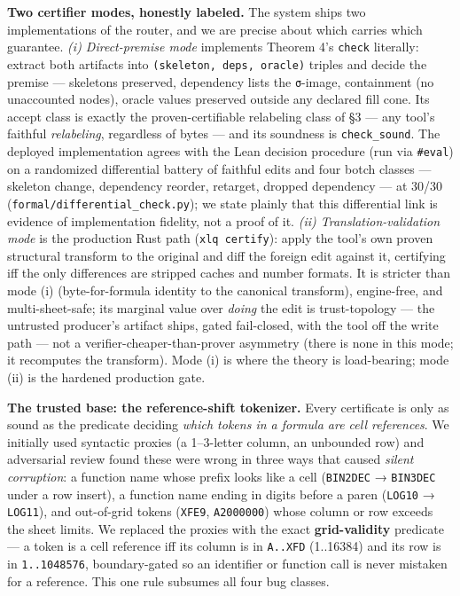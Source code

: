\documentclass[
  11pt,
]{article}
\begin{document}
\textbf{Two certifier modes, honestly labeled.} The system ships two
implementations of the router, and we are precise about which carries
which guarantee. \emph{(i) Direct-premise mode} implements Theorem 4's
\texttt{check} literally: extract both artifacts into
\texttt{(skeleton,\ deps,\ oracle)} triples and decide the premise ---
skeletons preserved, dependency lists the \texttt{σ}-image, containment
(no unaccounted nodes), oracle values preserved outside any declared
fill cone. Its accept class is exactly the proven-certifiable relabeling
class of §3 --- any tool's faithful \emph{relabeling}, regardless of
bytes --- and its soundness is \texttt{check\_sound}. The deployed
implementation agrees with the Lean decision procedure (run via
\texttt{\#eval}) on a randomized differential battery of faithful edits
and four botch classes --- skeleton change, dependency reorder,
retarget, dropped dependency --- at 30/30
(\texttt{formal/differential\_check.py}); we state plainly that this
differential link is evidence of implementation fidelity, not a proof of
it. \emph{(ii) Translation-validation mode} is the production Rust path
(\texttt{xlq\ certify}): apply the tool's own proven structural
transform to the original and diff the foreign edit against it,
certifying iff the only differences are stripped caches and number
formats. It is stricter than mode (i) (byte-for-formula identity to the
canonical transform), engine-free, and multi-sheet-safe; its marginal
value over \emph{doing} the edit is trust-topology --- the untrusted
producer's artifact ships, gated fail-closed, with the tool off the
write path --- not a verifier-cheaper-than-prover asymmetry (there is
none in this mode; it recomputes the transform). Mode (i) is where the
theory is load-bearing; mode (ii) is the hardened production gate.

\textbf{The trusted base: the reference-shift tokenizer.} Every
certificate is only as sound as the predicate deciding \emph{which
tokens in a formula are cell references}. We initially used syntactic
proxies (a 1--3-letter column, an unbounded row) and adversarial review
found these were wrong in three ways that caused \emph{silent
corruption}: a function name whose prefix looks like a cell
(\texttt{BIN2DEC} → \texttt{BIN3DEC} under a row insert), a function
name ending in digits before a paren (\texttt{LOG10} → \texttt{LOG11}),
and out-of-grid tokens (\texttt{XFE9}, \texttt{A2000000}) whose column
or row exceeds the sheet limits. We replaced the proxies with the exact
\textbf{grid-validity} predicate --- a token is a cell reference iff its
column is in \texttt{A..XFD} (1..16384) and its row is in
\texttt{1..1048576}, boundary-gated so an identifier or function call is
never mistaken for a reference. This one rule subsumes all four bug
classes.
\end{document}

